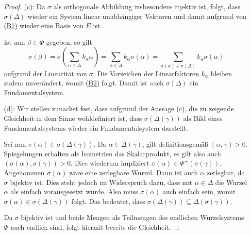 \begin{proof}
  (c): 
  Da $\sigma$ als orthogonale Abbildung insbesondere injektiv ist, folgt, dass $\sigma(\Delta)$ wieder ein System linear unabhängiger Vektoren und damit aufgrund von \hyperref[it:B1]{(B1)} wieder eine Basis von $E$ ist.
  
  Ist nun $\beta \in \Phi$ gegeben, so gilt
  \begin{displaymath}
  \sigma(\beta) 
    = \sigma(\sum_{\alpha \in \Delta} k_\alpha \alpha)
    = \sum_{\alpha \in \Delta} k_\alpha \sigma(\alpha)
    = \sum_{\sigma(\alpha) \in \sigma(\Delta)} k_\alpha \sigma(\alpha)
  \end{displaymath}
  aufgrund der Linearität von $\sigma$.
  Die Vorzeichen der Linearfaktoren $k_\alpha$ bleiben zudem unverändert, womit \hyperref[it:B2]{(B2)} folgt.
  Damit ist auch $\sigma(\Delta)$ ein Fundamentalsystem.

  (d):
  Wir stellen zunächst fest, dass aufgrund der Aussage (c), die zu zeigende Gleichheit in dem Sinne wohldefiniert ist, dass $\sigma(\Delta(\gamma))$ als Bild eines Fundamentalsystems wieder ein Fundamentalsystem darstellt.

  Sei nun $\sigma(\alpha) \in \sigma(\Delta(\gamma))$.
  Da $\alpha \in \Delta(\gamma)$, gilt definitionsgemäß $(\alpha, \gamma) > 0$.
  Spiegelungen erhalten als Isometrien das Skalarprodukt, es gilt also auch $(\sigma(\alpha), \sigma(\gamma)) > 0$.
  Dies wiederum impliziert $\sigma(\alpha) \in \Phi^+(\sigma(\gamma))$.
  Angenommen $\sigma(\alpha)$ wäre eine zerlegbare Wurzel.
  Dann ist auch $\alpha$ zerlegbar, da $\sigma$ bijektiv ist.
  Dies steht jedoch im Widerspruch dazu, dass mit $\alpha \in \Delta$ die Wurzel $\alpha$ als einfach vorausgesetzt wurde.
  Also muss $\sigma(\alpha)$ auch einfach sein, womit $\sigma(\alpha) \in \sigma(\Delta(\gamma))$ folgt.
  Das bedeutet, dass $\sigma(\Delta(\gamma)) \subseteq \Delta(\sigma(\gamma))$.
  
  Da $\sigma$ bijektiv ist und beide Mengen als Teilmengen des endlichen Wurzelsystems $\Phi$ auch endlich sind, folgt hiermit bereits die Gleichheit.
\end{proof}
